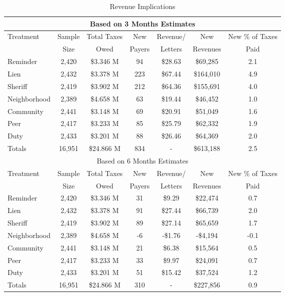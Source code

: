 \begin{table}[htbp]
\centering
\caption{Revenue Implications} \label{rev}
\begin{tabular}{lcccccc}
  \hline
\multicolumn{7}{c}{Based on 3 Months Estimates} \\
\hline
Treatment & Sample & Total Taxes & New & Revenue/ & New & New \% of Taxes \\ 
 & Size & Owed & Payers & Letters & Revenues & Paid \\
  \hline
Reminder & 2,420 & \$3.346 M & 94 & \$28.63 & \$69,285 & 2.1 \\ 
  Lien & 2,432 & \$3.378 M & 223 & \$67.44 & \$164,010 & 4.9 \\ 
  Sheriff & 2,419 & \$3.902 M & 212 & \$64.36 & \$155,691 & 4.0 \\ 
  Neighborhood & 2,389 & \$4.658 M & 63 & \$19.44 & \$46,452 & 1.0 \\ 
  Community & 2,441 & \$3.148 M & 69 & \$20.91 & \$51,049 & 1.6 \\ 
  Peer & 2,417 & \$3.233 M & 85 & \$25.79 & \$62,332 & 1.9 \\ 
  Duty & 2,433 & \$3.201 M & 88 & \$26.46 & \$64,369 & 2.0 \\ 
   \hline
Totals & 16,951 & \$24.866 M & 834 & - & \$613,188 & 2.5 \\ 
   \hline
\multicolumn{7}{c}{Based on 6 Months Estimates} \\
\hline
Treatment & Sample & Total Taxes & New & Revenue/ & New & New \% of Taxes \\ 
 & Size & Owed & Payers & Letters & Revenues & Paid \\
\hline
Reminder & 2,420 & \$3.346 M & 31 & \$9.29 & \$22,474 & 0.7 \\ 
  Lien & 2,432 & \$3.378 M & 91 & \$27.44 & \$66,739 & 2.0 \\ 
  Sheriff & 2,419 & \$3.902 M & 89 & \$27.14 & \$65,659 & 1.7 \\ 
  Neighborhood & 2,389 & \$4.658 M & -6 & -\$1.76 & -\$4,194 & -0.1 \\ 
  Community & 2,441 & \$3.148 M & 21 & \$6.38 & \$15,564 & 0.5 \\ 
  Peer & 2,417 & \$3.233 M & 33 & \$9.97 & \$24,091 & 0.7 \\ 
  Duty & 2,433 & \$3.201 M & 51 & \$15.42 & \$37,524 & 1.2 \\ 
  Totals & 16,951 & \$24.866 M & 310 & - & \$227,856 & 0.9 \\ 

\end{tabular}
\end{table}
